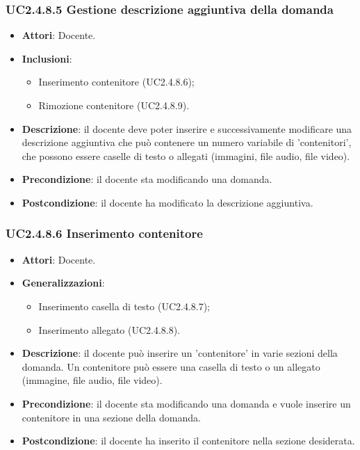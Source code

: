\subsubsection{UC2.4.8.5 Gestione descrizione aggiuntiva della domanda}
\begin{itemize}
\item \textbf{Attori}: Docente.
\item \textbf{Inclusioni}:
\begin{itemize}
\item Inserimento contenitore (UC2.4.8.6);
\item Rimozione contenitore (UC2.4.8.9).
\end{itemize}
\item \textbf{Descrizione}: il docente deve poter inserire e successivamente modificare una descrizione aggiuntiva che può contenere un numero variabile di 'contenitori', che possono essere caselle di testo o allegati (immagini, file audio, file video).
\item \textbf{Precondizione}: il docente sta modificando una domanda.
\item \textbf{Postcondizione}: il docente ha modificato la descrizione aggiuntiva.
\end{itemize}
\subsubsection{UC2.4.8.6 Inserimento contenitore}
\begin{itemize}
\item \textbf{Attori}: Docente.
\item \textbf{Generalizzazioni}:
\begin{itemize}
\item Inserimento casella di testo (UC2.4.8.7);
\item Inserimento allegato (UC2.4.8.8).
\end{itemize}
\item \textbf{Descrizione}: il docente può inserire un 'contenitore' in varie sezioni della domanda. Un contenitore può essere una casella di testo o un allegato (immagine, file audio, file video).
\item \textbf{Precondizione}: il docente sta modificando una domanda e vuole inserire un contenitore in una sezione della domanda.
\item \textbf{Postcondizione}: il docente ha inserito il contenitore nella sezione desiderata.
\end{itemize}
